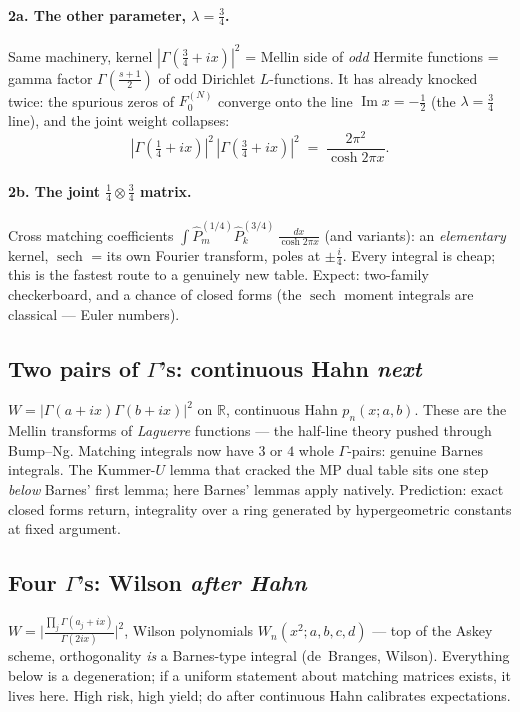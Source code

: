 \documentclass[11pt,a4paper]{article}
\newcommand{\R}{\mathbb{R}}
\begin{document}
\paragraph{2a. The other parameter, $\lambda=\tfrac34$.}
Same machinery, kernel $|\Gamma(\tfrac34+ix)|^2$ = Mellin side of
\emph{odd} Hermite functions = gamma factor $\Gamma(\frac{s+1}{2})$ of
odd Dirichlet $L$-functions. It has already knocked twice: the spurious
zeros of $F_0^{(N)}$ converge onto the line $\operatorname{Im} x =
-\tfrac12$ (the $\lambda=\tfrac34$ line), and the joint weight
collapses:
\[
  |\Gamma(\tfrac14+ix)|^2\,|\Gamma(\tfrac34+ix)|^2
  \;=\; \frac{2\pi^2}{\cosh 2\pi x}.
\]

\paragraph{2b. The joint $\tfrac14\otimes\tfrac34$ matrix.}
Cross matching coefficients
$\int \hat P^{(1/4)}_m \hat P^{(3/4)}_k\, \frac{dx}{\cosh 2\pi x}$
(and variants): an \emph{elementary} kernel, $\operatorname{sech}$ =
its own Fourier transform, poles at $\pm\tfrac{i}{4}$. Every integral
is cheap; this is the fastest route to a genuinely new table.
Expect: two-family checkerboard, and a chance of closed forms
(the $\operatorname{sech}$ moment integrals are classical --- Euler
numbers).

\subsection{Two pairs of $\Gamma$'s: continuous Hahn \hfill \normalfont\emph{next}}

$W = |\Gamma(a+ix)\Gamma(b+ix)|^2$ on $\R$, continuous Hahn
$p_n(x;a,b)$. These are the Mellin transforms of \emph{Laguerre}
functions --- the half-line theory pushed through Bump--Ng. Matching
integrals now have $3$ or $4$ whole $\Gamma$-pairs: genuine Barnes
integrals. The Kummer-$U$ lemma that cracked the MP dual table sits
one step \emph{below} Barnes' first lemma; here Barnes' lemmas apply
natively. Prediction: exact closed forms return, integrality over a
ring generated by hypergeometric constants at fixed argument.

\subsection{Four $\Gamma$'s: Wilson \hfill \normalfont\emph{after Hahn}}

$W = \bigl|\frac{\prod_{j} \Gamma(a_j+ix)}{\Gamma(2ix)}\bigr|^2$,
Wilson polynomials $W_n(x^2;a,b,c,d)$ --- top of the Askey scheme,
orthogonality \emph{is} a Barnes-type integral (de~Branges, Wilson).
Everything below is a degeneration; if a uniform statement about
matching matrices exists, it lives here. High risk, high yield;
do after continuous Hahn calibrates expectations.
\end{document}
